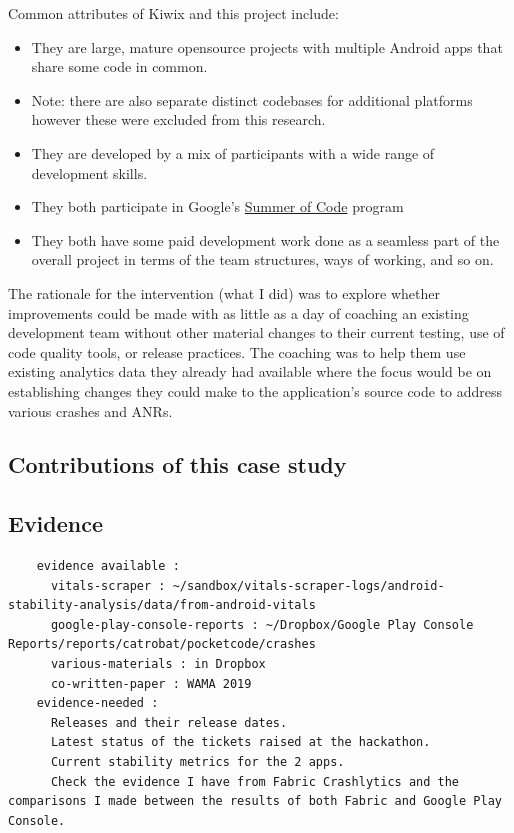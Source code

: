 Common attributes of Kiwix and this project include:
\begin{itemize}
    \item They are large, mature opensource projects with multiple Android apps that share some code in common. 
    \item Note: there are also separate distinct codebases for additional platforms however these were excluded from this research.
    \item They are developed by a mix of participants with a wide range of development skills.
    \item They both participate in Google's \href{https://summerofcode.withgoogle.com/}{Summer of Code} program
    \item They both have some paid development work done as a seamless part of the overall project in terms of the team structures, ways of working, and so on.
\end{itemize}

The rationale for the intervention (what I did) was to explore whether improvements could be made with as little as a day of coaching an existing development team without other material changes to their current testing, use of code quality tools, or release practices. The coaching was to help them use existing analytics data they already had available where the focus would be on establishing changes they could make to the application's source code to address various crashes and ANRs.

\subsection*{Contributions of this case study}




\subsection*{Evidence}
  \begin{verbatim}
    evidence available :
      vitals-scraper : ~/sandbox/vitals-scraper-logs/android-stability-analysis/data/from-android-vitals
      google-play-console-reports : ~/Dropbox/Google Play Console Reports/reports/catrobat/pocketcode/crashes
      various-materials : in Dropbox
      co-written-paper : WAMA 2019
    evidence-needed : 
      Releases and their release dates.
      Latest status of the tickets raised at the hackathon.
      Current stability metrics for the 2 apps.
      Check the evidence I have from Fabric Crashlytics and the comparisons I made between the results of both Fabric and Google Play Console.
  \end{verbatim}

